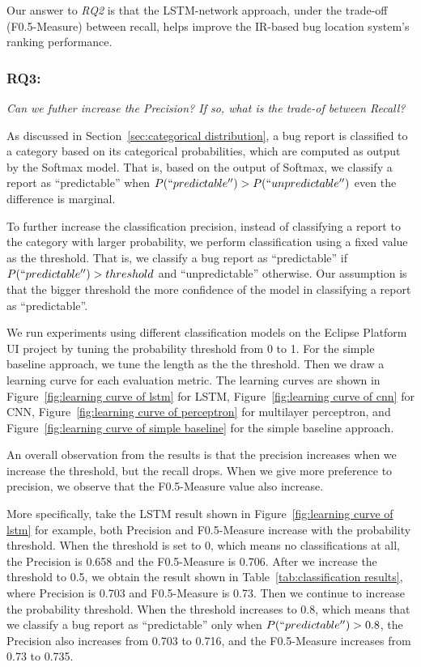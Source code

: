 Our answer to \textit{RQ2} is that the LSTM-network approach, under the trade-off (F0.5-Measure) between recall, helps improve the IR-based bug location system's ranking performance.

\subsubsection{\textbf{RQ3:}}
\label{sec:research question 3}
\textit{Can we futher increase the Precision? If so, what is the trade-of between Recall?}

As discussed in Section~\ref{sec:categorical distribution}, a bug report is classified to a category based on its categorical probabilities, which are computed as output by the Softmax model. That is, based on the output of Softmax, we classify a report as ``predictable'' when $P(``predictable'') > P(``unpredictable'')$ even the difference is marginal.

To further increase the classification precision, instead of classifying a report to the category with larger probability, we perform classification using a fixed value as the threshold. That is, we classify a bug report as ``predictable'' if $P(``predictable'') > threshold$ and ``unpredictable'' otherwise. Our assumption is that the bigger threshold the more confidence of the model in classifying a report as ``predictable''.

We run experiments using different classification models on the Eclipse Platform UI project by tuning the probability threshold from 0 to 1. For the simple baseline approach, we tune the length as the the threshold. Then we draw a learning curve for each evaluation metric. The learning curves are shown in Figure~\ref{fig:learning curve of lstm} for LSTM, Figure~\ref{fig:learning curve of cnn} for CNN, Figure~\ref{fig:learning curve of perceptron} for multilayer perceptron, and Figure~\ref{fig:learning curve of simple baseline} for the simple baseline approach.

An overall observation from the results is that the precision increases when we increase the threshold, but the recall drops. When we give more preference to precision, we observe that the F0.5-Measure value also increase.

More specifically, take the LSTM result shown in Figure~\ref{fig:learning curve of lstm} for example, both Precision and F0.5-Measure increase with the probability threshold. When the threshold is set to 0, which means no classifications at all, the Precision is 0.658 and the F0.5-Measure is 0.706. After we increase the threshold to 0.5, we obtain the result shown in Table~\ref{tab:classification results}, where Precision is 0.703 and F0.5-Measure is 0.73. Then we continue to increase the probability threshold. When the threshold increases to 0.8, which means that we classify a bug report as ``predictable'' only when $P(``predictable'') > 0.8$, the Precision also increases from 0.703 to 0.716, and the F0.5-Measure increases from 0.73 to 0.735.

